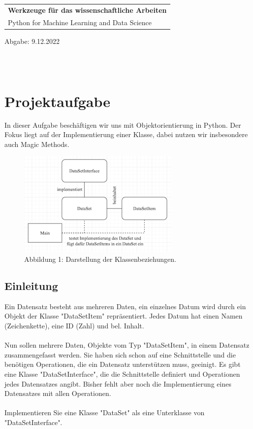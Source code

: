 \documentclass[]{article}
\begin{document}
\begin{center}
\begin{tabular}{l}
     \Large\textbf{Werkzeuge für das wissenschaftliche Arbeiten} \\
     \Large Python for Machine Learning and Data Science \\ 
\end{tabular} 
    Abgabe: 9.12.2022
\end{center}
\hline \\


\tableofcontents
\\

\section{Projektaufgabe}
In dieser Aufgabe beschäftigen wir uns mit Objektorientierung in Python. Der
Fokus liegt auf der Implementierung einer Klasse, dabei nutzen wir insbesondere
auch Magic Methods.\\

\begin{figure}[h]
    \centering
    \includegraphics{./../diagram/classes_files.png}
    \caption{Abbildung 1: Darstellung der Klassenbeziehungen.}
    \label{fig:my_label}
\end{figure}


\subsection{Einleitung}
Ein Datensatz besteht aus mehreren Daten, ein einzelnes Datum wird durch ein Objekt der Klasse "DataSetItem" repräsentiert.
Jedes Datum hat einen Namen (Zeichenkette), eine ID (Zahl) und bel. Inhalt.\\
\\
Nun sollen mehrere Daten, Objekte vom Typ "DataSetItem", in einem Datensatz zusammengefasst werden.
Sie haben sich schon auf eine Schnittstelle und die benötigen Operationen, die ein Datensatz unterstützen muss, geeinigt.
Es gibt eine Klasse "DataSetInterface", die die Schnittstelle definiert und Operationen jedes Datensatzes angibt.
Bisher fehlt aber noch die Implementierung eines Datensatzes mit allen Operationen.\\
\\
Implementieren Sie eine Klasse "DataSet" als eine Unterklasse von "DataSetInterface".\\
\\
\end{document}
